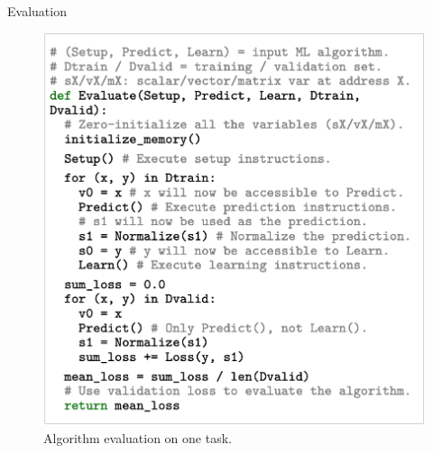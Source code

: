 \documentclass{beamer}
\begin{document}
\begin{frame}{Evaluation}
 
    \begin{figure}
        \centering
        \includegraphics[scale=0.24]{eval.png}
        \caption{Algorithm evaluation on one task.}
        \label{fig:success}
    \end{figure}
    
\end{frame}
\end{document}

